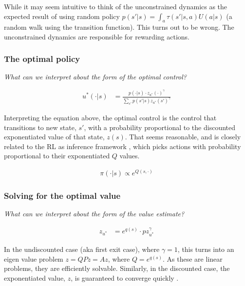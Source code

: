 While it may seem intuitive to think of the unconstrained dynamics as the expected result of using random policy
$p(s' | s) = \int_a \tau(s' | s, a)U(a|s)$ (a random walk using the transition function).
This turns out to be wrong. The unconstrained dynamics are responsible for rewarding actions.

\subsubsection{The optimal policy}

\begin{displayquote}
\textsl{What can we interpret about the form of the optimal control?}
\end{displayquote}

\begin{align*}
u^{* }(\cdot | s) &= \frac{p(\cdot | s)\cdot z_{u^{* }}(\cdot)^{\gamma}}{\sum_{s'} p(s' | s) z_{u^{* }}(s')^{\gamma}}
\end{align*}

Interpreting the equation above, the optimal control is the control that transitions to new state, $s'$, with a
probability proportional to the discounted exponentiated value of that state, $z(s)$.
That seems reasonable, and is closely related to the RL as inference framework \cite{Levinea},
which picks actions with probability proportional to their exponentiated $Q$ values.

\begin{align*}
\pi(\cdot|s) \propto e^{Q(s, \cdot)}
\end{align*}

\subsubsection{Solving for the optimal value}\label{solve-lmdp}

\begin{displayquote}
\textsl{What can we interpret about the form of the value estimate?}
\end{displayquote}

\begin{align*}
z_{u^{* }} &= e^{q(s)}\cdot p z_{u^{* }}^{\gamma}
\end{align*}

In the undiscounted case (aka first exit case), where $\gamma=1$, this turns into an eigen value
problem $z = QPz = Az$, where $Q = e^{q(s)}$. As these are linear problems, they are efficiently solvable.
Similarly, in the discounted case, the exponentiated value, $z$, is guaranteed to converge quickly \cite{Todorov2009}.

